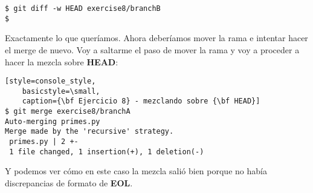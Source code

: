 \begin{lstlisting}[style=console_style,
	basicstyle=\small,
	caption={\bf Ejercicio 8} - Comparando resultados]
$ git diff -w HEAD exercise8/branchB
$
\end{lstlisting}

Exactamente lo que queríamos. Ahora deberíamos mover la rama e intentar hacer el merge de nuevo. Voy a saltarme el paso de mover la rama
y voy a proceder a hacer la mezcla sobre {\bf HEAD}:

\begin{lstlisting}[style=console_style,
	basicstyle=\small,
	caption={\bf Ejercicio 8} - mezclando sobre {\bf HEAD}]
$ git merge exercise8/branchA
Auto-merging primes.py
Merge made by the 'recursive' strategy.
 primes.py | 2 +-
 1 file changed, 1 insertion(+), 1 deletion(-)
\end{lstlisting}

Y podemos ver cómo en este caso la mezcla salió bien porque no había discrepancias de formato de {\bf EOL}.
